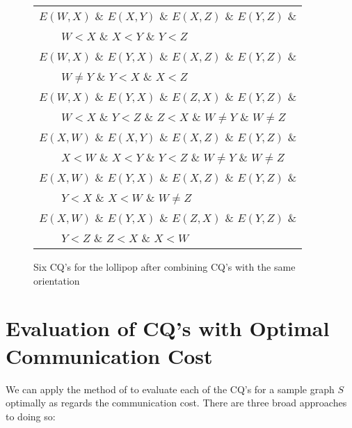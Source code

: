 \begin{figure}[htfb]
{\begin{center}
\begin{tabular}{l}
$E(W,X)$ \& $E(X,Y)$ \& $E(X,Z)$ \& $E(Y,Z)$ \&\\
~~~~$W<X$ \& $X<Y$ \& $Y<Z$\\
$E(W,X)$ \& $E(Y,X)$ \& $E(X,Z)$ \& $E(Y,Z)$ \&\\
~~~~$W\ne Y$ \& $Y<X$ \& $X<Z$\\
$E(W,X)$ \& $E(Y,X)$ \& $E(Z,X)$ \& $E(Y,Z)$ \&\\
~~~~$W<X$ \& $Y<Z$ \& $Z<X$ \& $W\ne Y$ \& $W\ne Z$\\
$E(X,W)$ \& $E(X,Y)$ \& $E(X,Z)$ \& $E(Y,Z)$ \&\\
~~~~$X<W$ \& $X<Y$ \& $Y<Z$ \& $W\ne Y$ \& $W\ne Z$\\
$E(X,W)$ \& $E(Y,X)$ \& $E(X,Z)$ \& $E(Y,Z)$ \&\\
~~~~$Y<X$ \& $X<W$ \& $W\ne Z$\\
$E(X,W)$ \& $E(Y,X)$ \& $E(Z,X)$ \& $E(Y,Z)$ \&\\
~~~~$Y<Z$ \& $Z<X$ \& $X<W$\\
\end{tabular}
\end{center}
}
\caption{Six CQ's for the lollipop after combining CQ's with the same orientation}
\label{lol-oriented-fig}
\end{figure}


\section{Evaluation of CQ's with Optimal Communication Cost}
\label{opt-eval-sect}

We can apply the method of \cite{AU10} to evaluate each of the CQ's for a sample graph $S$ optimally as regards the communication cost.  There are three broad approaches to doing so:

